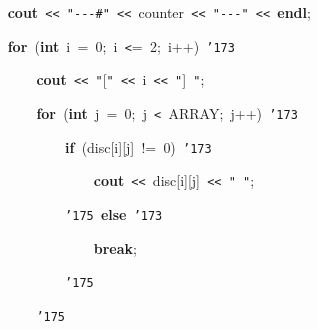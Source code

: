 \documentclass[a4paper,10pt]{article}
\def\mc{\relax}
\begin{document}
\noindent
\mbox{}{\tt\mc \ }{\tt\mc \ }{\tt\mc \ }{\tt\mc \ }\textbf{cout}{\tt\mc \ }{\tt <}{\tt <}{\tt\mc \ }{\tt "}{\tt -}{\tt -}{\tt -}{\tt\#}{\tt "}{\tt\mc \ }{\tt <}{\tt <}{\tt\mc \ }counter{\tt\mc \ }{\tt <}{\tt <}{\tt\mc \ }{\tt "}{\tt -}{\tt -}{\tt -}{\tt "}{\tt\mc \ }{\tt <}{\tt <}{\tt\mc \ }\textbf{endl};

\noindent
\mbox{}{\tt\mc \ }{\tt\mc \ }{\tt\mc \ }{\tt\mc \ }\textbf{for}{\tt\mc \ }(\textbf{int}{\tt\mc \ }i{\tt\mc \ }={\tt\mc \ }0;{\tt\mc \ }i{\tt\mc \ }{\tt <}={\tt\mc \ }2;{\tt\mc \ }i++){\tt\mc \ }{\tt\char'173}

\noindent
\mbox{}{\tt\mc \ }{\tt\mc \ }{\tt\mc \ }{\tt\mc \ }{\tt\mc \ }{\tt\mc \ }{\tt\mc \ }{\tt\mc \ }\textbf{cout}{\tt\mc \ }{\tt <}{\tt <}{\tt\mc \ }{\tt "}[{\tt "}{\tt\mc \ }{\tt <}{\tt <}{\tt\mc \ }i{\tt\mc \ }{\tt <}{\tt <}{\tt\mc \ }{\tt "}]{\tt\mc \ }{\tt "};

\noindent
\mbox{}{\tt\mc \ }{\tt\mc \ }{\tt\mc \ }{\tt\mc \ }{\tt\mc \ }{\tt\mc \ }{\tt\mc \ }{\tt\mc \ }\textbf{for}{\tt\mc \ }(\textbf{int}{\tt\mc \ }j{\tt\mc \ }={\tt\mc \ }0;{\tt\mc \ }j{\tt\mc \ }{\tt <}{\tt\mc \ }ARRAY;{\tt\mc \ }j++){\tt\mc \ }{\tt\char'173}

\noindent
\mbox{}{\tt\mc \ }{\tt\mc \ }{\tt\mc \ }{\tt\mc \ }{\tt\mc \ }{\tt\mc \ }{\tt\mc \ }{\tt\mc \ }{\tt\mc \ }{\tt\mc \ }{\tt\mc \ }{\tt\mc \ }\textbf{if}{\tt\mc \ }(disc[i][j]{\tt\mc \ }!={\tt\mc \ }0){\tt\mc \ }{\tt\char'173}

\noindent
\mbox{}{\tt\mc \ }{\tt\mc \ }{\tt\mc \ }{\tt\mc \ }{\tt\mc \ }{\tt\mc \ }{\tt\mc \ }{\tt\mc \ }{\tt\mc \ }{\tt\mc \ }{\tt\mc \ }{\tt\mc \ }{\tt\mc \ }{\tt\mc \ }{\tt\mc \ }{\tt\mc \ }\textbf{cout}{\tt\mc \ }{\tt <}{\tt <}{\tt\mc \ }disc[i][j]{\tt\mc \ }{\tt <}{\tt <}{\tt\mc \ }{\tt "}{\tt\mc \ }{\tt "};

\noindent
\mbox{}{\tt\mc \ }{\tt\mc \ }{\tt\mc \ }{\tt\mc \ }{\tt\mc \ }{\tt\mc \ }{\tt\mc \ }{\tt\mc \ }{\tt\mc \ }{\tt\mc \ }{\tt\mc \ }{\tt\mc \ }{\tt\char'175}{\tt\mc \ }\textbf{else}{\tt\mc \ }{\tt\char'173}

\noindent
\mbox{}{\tt\mc \ }{\tt\mc \ }{\tt\mc \ }{\tt\mc \ }{\tt\mc \ }{\tt\mc \ }{\tt\mc \ }{\tt\mc \ }{\tt\mc \ }{\tt\mc \ }{\tt\mc \ }{\tt\mc \ }{\tt\mc \ }{\tt\mc \ }{\tt\mc \ }{\tt\mc \ }\textbf{break};

\noindent
\mbox{}{\tt\mc \ }{\tt\mc \ }{\tt\mc \ }{\tt\mc \ }{\tt\mc \ }{\tt\mc \ }{\tt\mc \ }{\tt\mc \ }{\tt\mc \ }{\tt\mc \ }{\tt\mc \ }{\tt\mc \ }{\tt\char'175}

\noindent
\mbox{}{\tt\mc \ }{\tt\mc \ }{\tt\mc \ }{\tt\mc \ }{\tt\mc \ }{\tt\mc \ }{\tt\mc \ }{\tt\mc \ }{\tt\char'175}
\end{document}
